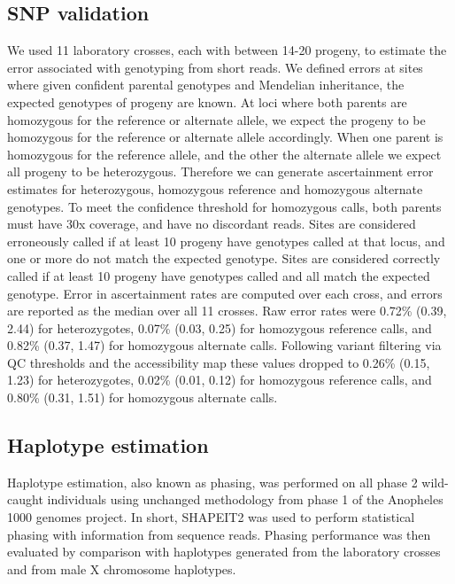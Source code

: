 \documentclass[a4paper,11pt,abstracton,hidelinks]{scrartcl}
\begin{document}
\subsection*{SNP validation}

We used 11 laboratory crosses, each with between 14-20 progeny, to estimate the error associated with genotyping from short reads. 
%
We defined errors at sites where given confident parental genotypes and Mendelian inheritance, the expected genotypes of progeny are known. 
%
At loci where both parents are homozygous for the reference or alternate allele, we expect the progeny to be homozygous for the reference or alternate allele accordingly.
%
When one parent is homozygous for the reference allele, and the other the alternate allele we expect all progeny to be heterozygous. 
%
Therefore we can generate ascertainment error estimates for heterozygous, homozygous reference and homozygous alternate genotypes.
%
To meet the confidence threshold for homozygous calls, both parents must have 30x coverage, and have no discordant reads.
%
Sites are considered erroneously called if at least 10 progeny have genotypes called at that locus, and one or more do not match the expected genotype. 
%
Sites are considered correctly called if at least 10 progeny have genotypes called and all match the expected genotype. 
%
Error in ascertainment rates are computed over each cross, and errors are reported as the median over all 11 crosses. 
%
%
Raw error rates were 0.72\% (0.39, 2.44) for heterozygotes, 0.07\% (0.03, 0.25) for homozygous reference calls, and 0.82\% (0.37, 1.47) for homozygous alternate calls. 
%
Following variant filtering via QC thresholds and the accessibility map these values dropped to 0.26\% (0.15, 1.23) for heterozygotes, 0.02\% (0.01, 0.12) for homozygous reference calls, and 0.80\% (0.31, 1.51) for homozygous alternate calls. 


\subsection*{Haplotype estimation}

%
Haplotype estimation, also known as phasing, was performed on all phase 2 wild-caught individuals using unchanged methodology from phase 1 of the Anopheles 1000 genomes project\cite{Ag1000G2017}.
%
In short, SHAPEIT2 was used to perform statistical phasing with information from sequence reads.
%
Phasing performance was then evaluated by comparison with haplotypes generated from the laboratory crosses and from male X chromosome haplotypes.
\end{document}
